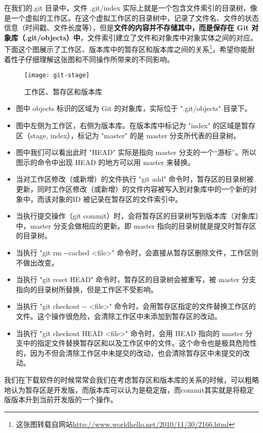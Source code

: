 在我们的.git 目录中，文件 .git/index 实际上就是一个包含文件索引的目录树，像是一个虚拟的工作区。在这个虚拟工作区的目录树中，记录了文件名、文件的状态信息（时间戳、文件长度等），但是\textbf{文件的内容并不存储其中，而是保存在 Git 对象库（.git/objects）中}，文件索引建立了文件和对象库中对象实体之间的对应。下面这个图展示了工作区、版本库中的暂存区和版本库之间的关系\footnote{这张图转载自网站\url{http://www.worldhello.net/2010/11/30/2166.html}}，希望你能耐着性子仔细理解这张图和不同操作所带来的不同影响。

\begin{figure}[htbp]
  \centering
  \texttt{[image: git-stage]}
  \caption{工作区、暂存区和版本库}\label{fig:git-stage} 
\end{figure}

\begin{itemize}
\item 图中 objects 标识的区域为 Git 的对象库，实际位于 ".git/objects" 目录下。
\item 图中左侧为工作区，右侧为版本库。在版本库中标记为 "index" 的区域是暂存区（stage, index），标记为 "master" 的是 master 分支所代表的目录树。
\item 图中我们可以看出此时 "HEAD" 实际是指向 master 分支的一个“游标”。所以图示的命令中出现 HEAD 的地方可以用 master 来替换。
\item 当对工作区修改（或新增）的文件执行 "git add" 命令时，暂存区的目录树被更新，同时工作区修改（或新增）的文件内容被写入到对象库中的一个新的对象中，而该对象的ID 被记录在暂存区的文件索引中。
\item 当执行提交操作（git commit）时，会将暂存区的目录树写到版本库（对象库）中，master 分支会做相应的更新。即 master 指向的目录树就是提交时暂存区的目录树。
\item 当执行 "git rm -{}-cached <file>" 命令时，会直接从暂存区删除文件，工作区则不做出改变。
\item 当执行 "git reset HEAD" 命令时，暂存区的目录树会被重写，被 master 分支指向的目录树所替换，但是工作区不受影响。
\item 当执行 "git checkout -{}- <file>" 命令时，会用暂存区指定的文件替换工作区的文件。这个操作很危险，会清除工作区中未添加到暂存区的改动。
\item 当执行 "git checkout HEAD <file>" 命令时，会用 HEAD 指向的 master 分支中的指定文件替换暂存区和以及工作区中的文件。这个命令也是极具危险性的，因为不但会清除工作区中未提交的改动，也会清除暂存区中未提交的改动。
\end{itemize}

我们在下载软件的时候常常会我们在考虑暂存区和版本库的关系的时候，可以粗略地认为暂存区是开发版，而版本库可以认为是稳定版，而commit其实就是将稳定版版本升到当前开发版的一个操作。
 
